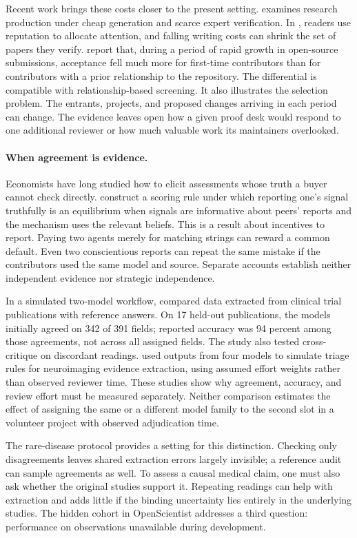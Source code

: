 \documentclass[11pt,letterpaper]{article}
\begin{document}
Recent work brings these costs closer to the present setting. \citet{nguyen} examines research production under cheap generation and scarce expert verification. In \citet{kuhle}, readers use reputation to allocate attention, and falling writing costs can shrink the set of papers they verify. \citet{heath} report that, during a period of rapid growth in open-source submissions, acceptance fell much more for first-time contributors than for contributors with a prior relationship to the repository. The differential is compatible with relationship-based screening. It also illustrates the selection problem. The entrants, projects, and proposed changes arriving in each period can change. The evidence leaves open how a given proof desk would respond to one additional reviewer or how much valuable work its maintainers overlooked.

\paragraph{When agreement is evidence.}
Economists have long studied how to elicit assessments whose truth a buyer cannot check directly. \citet{miller} construct a scoring rule under which reporting one's signal truthfully is an equilibrium when signals are informative about peers' reports and the mechanism uses the relevant beliefs. This is a result about incentives to report. Paying two agents merely for matching strings can reward a common default. Even two conscientious reports can repeat the same mistake if the contributors used the same model and source. Separate accounts establish neither independent evidence nor strategic independence.

In a simulated two-model workflow, \citet{khan} compared data extracted from clinical trial publications with reference answers. On 17 held-out publications, the models initially agreed on 342 of 391 fields; reported accuracy was 94 percent among those agreements, not across all assigned fields. The study also tested cross-critique on discordant readings. \citet{sanlier} used outputs from four models to simulate triage rules for neuroimaging evidence extraction, using assumed effort weights rather than observed reviewer time. These studies show why agreement, accuracy, and review effort must be measured separately. Neither comparison estimates the effect of assigning the same or a different model family to the second slot in a volunteer project with observed adjudication time.

The rare-disease protocol provides a setting for this distinction. Checking only disagreements leaves shared extraction errors largely invisible; a reference audit can sample agreements as well. To assess a causal medical claim, one must also ask whether the original studies support it. Repeating readings can help with extraction and adds little if the binding uncertainty lies entirely in the underlying studies. The hidden cohort in OpenScientist addresses a third question: performance on observations unavailable during development.
\end{document}
